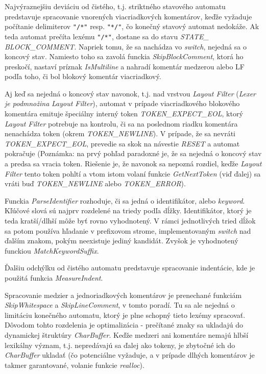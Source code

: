 \documentclass[11pt,a4paper]{article}
\begin{document}
  Najvýraznejšiu deviáciu od čistého, t.j. striktného stavového automatu predstavuje spracovanie
  vnorených viacriadkových komentárov, keďže vyžaduje počítanie delimiterov \verb+"/*"+ resp.
  \verb+"*/"+, čo konečný stavový automat nedokáže. Ak teda automat prečíta
  lexému \verb+"/*"+, dostane sa do stavu \textit{STATE\_\allowbreak
  BLOCK\_\allowbreak COMMENT}. Napriek tomu,
  že sa nachádza vo \textit{switch}, nejedná sa o koncový stav. Namiesto toho sa
  zavolá funckia \textit{SkipBlockComment}, ktorá ho preskočí, nastaví príznak
  \textit{IsMultiline} a nahradí komentár medzerou alebo LF podľa toho, či bol blokový
  komentár viacriadkový. 

  Aj keď sa nejedná o koncový stav navonok, t.j. nad
  vrstvou \textit{Layout Filter} (\textit{Lexer je podmnožina} \textit{Layout
  Filter}), 
  automat v prípade viacriadkového blokového komentára
  emituje špeciálny interný token \textit{TOKEN\_\allowbreak EXPECT\_\allowbreak EOL}, ktorý
  \textit{Layout Filter}
  potrebuje na kontrolu, či sa na poslednom riadku komentára nenachádza token
  (okrem \textit{TOKEN\_NEWLINE}). V prípade, že sa nevráti
  \textit{TOKEN\_\allowbreak EXPECT\_\allowbreak EOL}, prevedie
  sa skok na návestie \textit{RESET} a automat pokračuje (Poznámka: na prvý pohľad
  paradoxné je, že sa nejedná o koncový stav a predsa sa vracia token. Riešenie
  je, že navonok sa nepozná rozdiel, keďže \textit{Layout Filter} tento token pohltí a
  vtom istom volaní funkcie \textit{GetNextToken} (viď ďalej) sa vráti buď
  \textit{TOKEN\_NEWLINE} alebo \textit{TOKEN\_ERROR}).

  Funckia \textit{ParseIdentifier} rozhoduje, či sa jedná o identifikátor, alebo
  \textit{keyword}. Kľúčové slová sú najprv rozdelené na triedy podľa dĺžky.
  Identifikátor, ktorý je teda kratší/dlhší môže byť rovno vyhodnotený. V rámci
  jednotlivých tried dĺžok sa potom používa hľadanie v prefixovom strome,
  implementovaným \textit{switch} nad ďalším znakom, pokým neexistuje jediný kandidát.
  Zvyšok je vyhodnotený funckiou \textit{MatchKeywordSuffix}.

  Ďalšiu odchýlku od čistého automatu predstavuje spracovanie indentácie,
  kde je použitá funkcia \textit{MeasureIndent}.

  Spracovanie medzier a jednoriadkových komentárov je prenechané funkciám
  \textit{SkipWhitespace} a \textit{SkipLineComment}, v tomto poradí. Tu sa ale nejedná o limitáciu
  konečného automatu, ktorý je plne schopný tieto lexémy spracovať. Dôvodom
  tohto rozdelenia je optimalizácia - prečítané znaky sa ukladajú do dynamickej štruktúry
  \textit{CharBuffer}. Keďže medzeri ani komentáre nemajú hlbší lexikálny význam, t.j.
  nepredávajú sa ďalej ako tokeny, je zbytočné ich do \textit{CharBuffer} ukladať (čo
  potenciálne vyžaduje, a v prípade dlhých komentárov je takmer garantované,
  volanie funkcie \textit{realloc}). 
\end{document}
